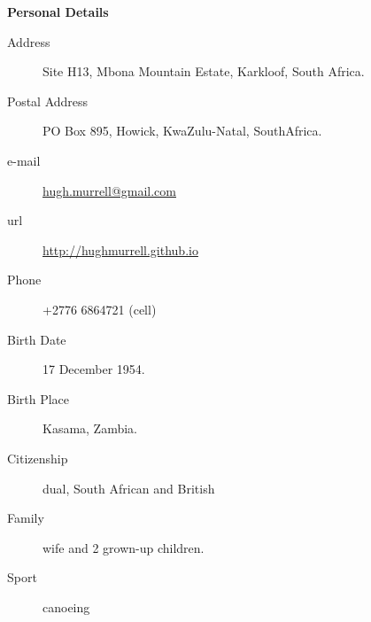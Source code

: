 \begin{description}\item[] \begin{description}\item[] {\large \bf   Personal Details  }
\begin{description}
\item[Address]  Site H13, Mbona Mountain Estate, Karkloof, South Africa.
\item[Postal Address] PO Box 895, Howick, KwaZulu-Natal, SouthAfrica.
\item[e-mail]  \url{hugh.murrell@gmail.com}
\item[url]  \url{http://hughmurrell.github.io}
\item[Phone]  +2776 6864721 (cell) 
\item[Birth Date]  17 December 1954.
\item[Birth Place]  Kasama, Zambia.
\item[Citizenship]  dual, South African and British
\item[Family]  wife and 2 grown-up children.
\item[Sport]  canoeing 
\end{description}
\end{description}
\end{description}
\label{f0}
